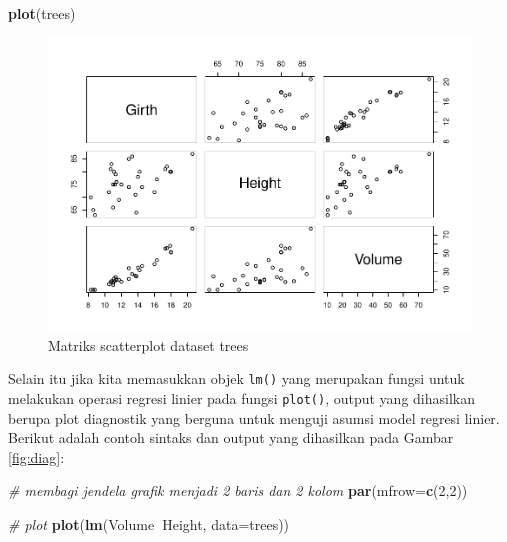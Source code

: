 \documentclass[]{book}
\newenvironment{Shaded}{\begin{snugshade}}{\end{snugshade}}
\newcommand{\KeywordTok}[1]{\textcolor[rgb]{0.13,0.29,0.53}{\textbf{#1}}}
\newcommand{\DataTypeTok}[1]{\textcolor[rgb]{0.13,0.29,0.53}{#1}}
\newcommand{\DecValTok}[1]{\textcolor[rgb]{0.00,0.00,0.81}{#1}}
\newcommand{\CommentTok}[1]{\textcolor[rgb]{0.56,0.35,0.01}{\textit{#1}}}
\newcommand{\OperatorTok}[1]{\textcolor[rgb]{0.81,0.36,0.00}{\textbf{#1}}}
\newcommand{\NormalTok}[1]{#1}
\begin{document}
\begin{Shaded}
\begin{Highlighting}[]
\KeywordTok{plot}\NormalTok{(trees)}
\end{Highlighting}
\end{Shaded}

\begin{figure}

{\centering \includegraphics[width=0.8\linewidth]{EnvStat_files/figure-latex/scatter2-1} 

}

\caption{Matriks scatterplot dataset trees}\label{fig:scatter2}
\end{figure}

Selain itu jika kita memasukkan objek \texttt{lm()} yang merupakan
fungsi untuk melakukan operasi regresi linier pada fungsi
\texttt{plot()}, output yang dihasilkan berupa plot diagnostik yang
berguna untuk menguji asumsi model regresi linier. Berikut adalah contoh
sintaks dan output yang dihasilkan pada Gambar \ref{fig:diag}:

\begin{Shaded}
\begin{Highlighting}[]
\CommentTok{# membagi jendela grafik menjadi 2 baris dan 2 kolom}
\KeywordTok{par}\NormalTok{(}\DataTypeTok{mfrow=}\KeywordTok{c}\NormalTok{(}\DecValTok{2}\NormalTok{,}\DecValTok{2}\NormalTok{))}

\CommentTok{# plot}
\KeywordTok{plot}\NormalTok{(}\KeywordTok{lm}\NormalTok{(Volume}\OperatorTok{~}\NormalTok{Height, }\DataTypeTok{data=}\NormalTok{trees))}
\end{Highlighting}
\end{Shaded}
\end{document}
